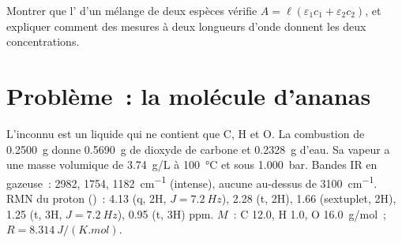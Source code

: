 \begin{exercise}[$\star\star\star$]\label{exo:b1:structure-spectroscopy:12}
Montrer que l' d'un mélange de deux espèces vérifie $A = \ell(\varepsilon_1c_1
+ \varepsilon_2c_2)$, et expliquer comment des mesures à deux longueurs
d'onde donnent les deux concentrations.
\end{exercise}

\section{Problème~: la molécule d'ananas}

\begin{problem}
\label{pb:b1:structure-spectroscopy:1}
L'inconnu est un liquide qui ne contient que C, H et O. La combustion de
\qty{0.2500}{g} donne \qty{0.5690}{g} de dioxyde de carbone et
\qty{0.2328}{g} d'eau. Sa vapeur a une masse volumique de
\qty{3.74}{g/L} à
\qty{100}{\celsius} et sous \qty{1.000}{bar}. Bandes IR en 
gazeuse~: 2982,
1754, \qty{1182}{cm^{-1}} (intense), aucune au-dessus de
\qty{3100}{cm^{-1}}. RMN du proton ()~: 4.13 (q, 2H, $J = \qty{7.2}{Hz}$),
2.28 (t, 2H), 1.66 (sextuplet, 2H), 1.25 (t, 3H, $J = \qty{7.2}{Hz}$), 0.95
(t, 3H) ppm. $M$~: C 12.0, H 1.0, O \qty{16.0}{g/mol}~; $R =
\qty{8.314}{J/(K.mol)}$.

\begin{center}
\end{center}


\end{problem}
